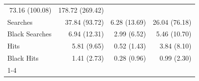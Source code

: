 \begin{table}[!h]
\begin{tabular}{llll}
  \multicolumn{1}{r}{73.16 (100.08)} &
  \multicolumn{1}{r}{178.72 (269.42)} \\
\multicolumn{1}{l}{\hspace{1em}Searches} &
  \multicolumn{1}{r}{37.84 (93.72)} &
  \multicolumn{1}{r}{6.28 (13.69)} &
  \multicolumn{1}{r}{26.04 (76.18)} \\
\multicolumn{1}{l}{\hspace{1em}Black Searches} &
  \multicolumn{1}{r}{6.94 (12.31)} &
  \multicolumn{1}{r}{2.99 (6.52)} &
  \multicolumn{1}{r}{5.46 (10.70)} \\
\multicolumn{1}{l}{\hspace{1em}Hits} &
  \multicolumn{1}{r}{5.81 (9.65)} &
  \multicolumn{1}{r}{0.52 (1.43)} &
  \multicolumn{1}{r}{3.84 (8.10)} \\
\multicolumn{1}{l}{\hspace{1em}Black Hits} &
  \multicolumn{1}{r}{1.41 (2.73)} &
  \multicolumn{1}{r}{0.28 (0.96)} &
  \multicolumn{1}{r}{0.99 (2.30)} \\
\cline{1-4}
\end{tabular}
\end{table}
